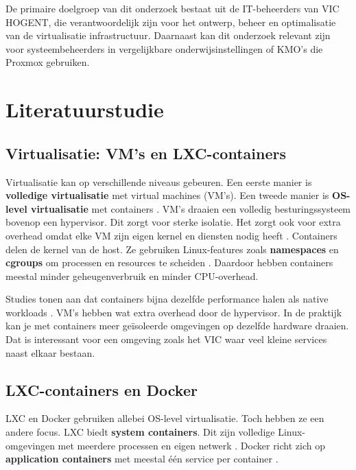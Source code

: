 De primaire doelgroep van dit onderzoek bestaat uit de IT-beheerders van VIC HOGENT, die verantwoordelijk zijn voor het ontwerp, beheer en optimalisatie van de virtualisatie infrastructuur. Daarnaast kan dit onderzoek relevant zijn voor systeembeheerders in vergelijkbare onderwijsinstellingen of KMO's die Proxmox gebruiken.



\section{Literatuurstudie}%
\label{sec:literatuurstudie}

\subsection{Virtualisatie: VM's en LXC-containers}

Virtualisatie kan op verschillende niveaus gebeuren. Een eerste manier is \textbf{volledige virtualisatie} met virtual machines (VM's). Een tweede manier is \textbf{OS-level virtualisatie} met containers \autocite{Felter2015}. VM's draaien een volledig besturingssysteem bovenop een hypervisor. Dit zorgt voor sterke isolatie. Het zorgt ook voor extra overhead omdat elke VM zijn eigen kernel en diensten nodig heeft \autocite{Sharma2016}. Containers delen de kernel van de host. Ze gebruiken Linux-features zoals \textbf{namespaces} en \textbf{cgroups} om processen en resources te scheiden \autocite{Merkel2014, Nginx2021}. Daardoor hebben containers meestal minder geheugenverbruik en minder CPU-overhead.

Studies tonen aan dat containers bijna dezelfde performance halen als native workloads \autocite{Felter2015, ArXiv2023Convergence}. VM's hebben wat extra overhead door de hypervisor. In de praktijk kan je met containers meer geïsoleerde omgevingen op dezelfde hardware draaien. Dat is interessant voor een omgeving zoals het VIC waar veel kleine services naast elkaar bestaan.

\subsection{LXC-containers en Docker}

LXC en Docker gebruiken allebei OS-level virtualisatie. Toch hebben ze een andere focus. LXC biedt \textbf{system containers}. Dit zijn volledige Linux-omgevingen met meerdere processen en eigen netwerk \autocite{Soltesz2007}. Docker richt zich op \textbf{application containers} met meestal één service per container \autocite{Merkel2014}.


